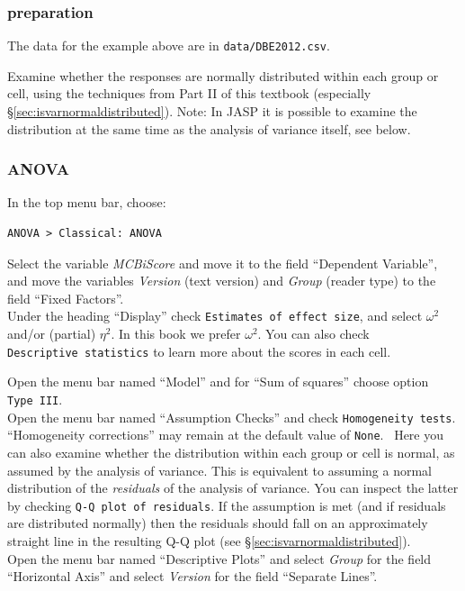 \documentclass[
]{book}
\begin{document}
\subsubsection{preparation}\label{preparation-4}

The data for the example above are in \texttt{data/DBE2012.csv}.

Examine whether the responses are normally distributed within each group or cell, using the
techniques from Part II of this textbook (especially
§\ref{sec:isvarnormaldistributed}).
Note: In JASP it is possible to examine the distribution at the same time as the analysis of variance itself, see below.

\subsubsection{ANOVA}\label{anova-4}

In the top menu bar, choose:

\begin{verbatim}
ANOVA > Classical: ANOVA
\end{verbatim}

Select the variable \emph{MCBiScore} and move it to the field ``Dependent Variable'', and move the variables \emph{Version} (text version) and \emph{Group} (reader type) to the field ``Fixed Factors''.\\
Under the heading ``Display'' check \texttt{Estimates\ of\ effect\ size}, and select \(\omega^2\) and/or (partial) \(\eta^2\). In this book we prefer \(\omega^2\).
You can also check \texttt{Descriptive\ statistics} to learn more about the scores in each cell.

Open the menu bar named ``Model'' and for ``Sum of squares'' choose option \texttt{Type\ III}.\\
Open the menu bar named ``Assumption Checks'' and check \texttt{Homogeneity\ tests}.\\
``Homogeneity corrections'' may remain at the default value of \texttt{None}.~
Here you can also examine whether the distribution within each group or cell is normal, as assumed by the analysis of variance. This is equivalent to assuming a normal distribution of the \emph{residuals} of the analysis of variance. You can inspect the latter by checking \texttt{Q-Q\ plot\ of\ residuals}. If the assumption is met (and if residuals are distributed normally) then the residuals should fall on an approximately straight line in the resulting Q-Q plot (see §\ref{sec:isvarnormaldistributed}).\\
Open the menu bar named ``Descriptive Plots'' and select \emph{Group} for the field ``Horizontal Axis'' and select \emph{Version} for the field ``Separate Lines''.
\end{document}
